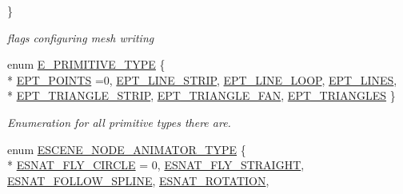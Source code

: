\begin{DoxyCompactItemize}
 \}\begin{DoxyCompactList}\small\item\em flags configuring mesh writing \end{DoxyCompactList}
\item 
enum \hyperlink{namespaceirr_1_1scene_a5d7de82f2169761194b2f44d95cdc1dc}{E\+\_\+\+P\+R\+I\+M\+I\+T\+I\+V\+E\+\_\+\+T\+Y\+PE} \{ \\*
\hyperlink{namespaceirr_1_1scene_a5d7de82f2169761194b2f44d95cdc1dca180689eadf794441c2c2dcd87462e203}{E\+P\+T\+\_\+\+P\+O\+I\+N\+TS} =0, 
\hyperlink{namespaceirr_1_1scene_a5d7de82f2169761194b2f44d95cdc1dca5e391340a0edd5f94b7e2a977637215c}{E\+P\+T\+\_\+\+L\+I\+N\+E\+\_\+\+S\+T\+R\+IP}, 
\hyperlink{namespaceirr_1_1scene_a5d7de82f2169761194b2f44d95cdc1dcaf54da57a43051cfc6e95185b38e86625}{E\+P\+T\+\_\+\+L\+I\+N\+E\+\_\+\+L\+O\+OP}, 
\hyperlink{namespaceirr_1_1scene_a5d7de82f2169761194b2f44d95cdc1dca1227c9648d4d9d7449ca1f959740b92b}{E\+P\+T\+\_\+\+L\+I\+N\+ES}, 
\\*
\hyperlink{namespaceirr_1_1scene_a5d7de82f2169761194b2f44d95cdc1dcaef19e8b586de395af81c8cd9851a1b40}{E\+P\+T\+\_\+\+T\+R\+I\+A\+N\+G\+L\+E\+\_\+\+S\+T\+R\+IP}, 
\hyperlink{namespaceirr_1_1scene_a5d7de82f2169761194b2f44d95cdc1dca7646edca10a2b18da4c0fd49cc8f11e4}{E\+P\+T\+\_\+\+T\+R\+I\+A\+N\+G\+L\+E\+\_\+\+F\+AN}, 
\hyperlink{namespaceirr_1_1scene_a5d7de82f2169761194b2f44d95cdc1dca237fc76e4b259febd27b4b84066ca581}{E\+P\+T\+\_\+\+T\+R\+I\+A\+N\+G\+L\+ES}
 \}\begin{DoxyCompactList}\small\item\em Enumeration for all primitive types there are. \end{DoxyCompactList}
\item 
enum \hyperlink{namespaceirr_1_1scene_a327a1e43872705cf8f3f3342fb307d19}{E\+S\+C\+E\+N\+E\+\_\+\+N\+O\+D\+E\+\_\+\+A\+N\+I\+M\+A\+T\+O\+R\+\_\+\+T\+Y\+PE} \{ \\*
\hyperlink{namespaceirr_1_1scene_a327a1e43872705cf8f3f3342fb307d19add5f15ecd6c0209d4e3d81a287ae9a66}{E\+S\+N\+A\+T\+\_\+\+F\+L\+Y\+\_\+\+C\+I\+R\+C\+LE} = 0, 
\hyperlink{namespaceirr_1_1scene_a327a1e43872705cf8f3f3342fb307d19af71dad2be8d964a88329d2727fb53b74}{E\+S\+N\+A\+T\+\_\+\+F\+L\+Y\+\_\+\+S\+T\+R\+A\+I\+G\+HT}, 
\hyperlink{namespaceirr_1_1scene_a327a1e43872705cf8f3f3342fb307d19addc7e3bb5180f7087546ccab14dcc4ad}{E\+S\+N\+A\+T\+\_\+\+F\+O\+L\+L\+O\+W\+\_\+\+S\+P\+L\+I\+NE}, 
\hyperlink{namespaceirr_1_1scene_a327a1e43872705cf8f3f3342fb307d19a689aa5051e83b7f61a7abba85eb1be52}{E\+S\+N\+A\+T\+\_\+\+R\+O\+T\+A\+T\+I\+ON}, 

\end{DoxyCompactItemize}
